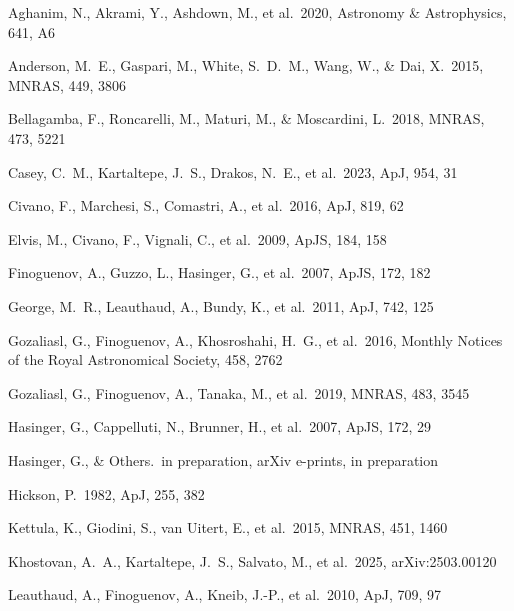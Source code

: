 \documentclass{aa}
\begin{document}
\begin{thebibliography}{}

 Aghanim, N., Akrami, Y., Ashdown, M., et al.\ 2020, Astronomy \& Astrophysics, 641, A6

 Anderson, M.~E., Gaspari, M., White, S.~D.~M., Wang, W., \& Dai, X.\ 2015, MNRAS, 449, 3806

 Bellagamba, F., Roncarelli, M., Maturi, M., \& Moscardini, L.\ 2018, MNRAS, 473, 5221

 Casey, C.~M., Kartaltepe, J.~S., Drakos, N.~E., et al.\ 2023, ApJ, 954, 31

 Civano, F., Marchesi, S., Comastri, A., et al.\ 2016, ApJ, 819, 62

 Elvis, M., Civano, F., Vignali, C., et al.\ 2009, ApJS, 184, 158

 Finoguenov, A., Guzzo, L., Hasinger, G., et al.\ 2007, ApJS, 172, 182

 George, M.~R., Leauthaud, A., Bundy, K., et al.\ 2011, ApJ, 742, 125

 Gozaliasl, G., Finoguenov, A., Khosroshahi, H.~G., et al.\ 2016, Monthly Notices of the Royal Astronomical Society, 458, 2762

 Gozaliasl, G., Finoguenov, A., Tanaka, M., et al.\ 2019, MNRAS, 483, 3545

 Hasinger, G., Cappelluti, N., Brunner, H., et al.\ 2007, ApJS, 172, 29

 Hasinger, G., \& Others.\ in preparation, arXiv e-prints, in preparation

 Hickson, P.\ 1982, ApJ, 255, 382

 Kettula, K., Giodini, S., van Uitert, E., et al.\ 2015, MNRAS, 451, 1460

 Khostovan, A.~A., Kartaltepe, J.~S., Salvato, M., et al.\ 2025, arXiv:2503.00120

 Leauthaud, A., Finoguenov, A., Kneib, J.-P., et al.\ 2010, ApJ, 709, 97


\end{thebibliography}
\end{document}
